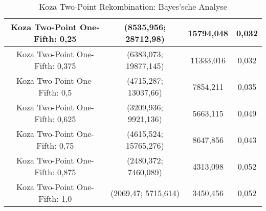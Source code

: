 \begin{table}[H]
\begin{tabular}{c | c | c | c}
		\hline
		Koza Two-Point One-Fifth: 0,25 & (\color{red}8535,956\color{black}; \color{red}28712,98\color{black}) & \color{red}15794,048\color{black} & \color{red}0,032\color{black}\\
		\hline
		Koza Two-Point One-Fifth: 0,375 & (6383,073; 19877,145) & 11333,016 & \color{red}0,032\color{black}\\
		\hline
		Koza Two-Point One-Fifth: 0,5 & (4715,287; 13037,66) & 7854,211 & 0,035\\
		\hline
		Koza Two-Point One-Fifth: 0,625 & (3209,936; 9921,136) & 5663,115 & 0,049\\
		\hline
		Koza Two-Point One-Fifth: 0,75 & (4615,524; 15765,276) & 8647,856 & 0,043\\
		\hline
		Koza Two-Point One-Fifth: 0,875 & (2480,372; \color{Green}7460,089\color{black}) & 4313,098 & \color{Green}0,052\color{black}\\
		\hline
		Koza Two-Point One-Fifth: 1,0 & (\color{Green}2069,47\color{black}; \color{Green}5715,614\color{black}) & \color{Green}3450,456\color{black} & 0,052\\
	\end{tabular}
	\caption{Koza Two-Point Rekombination: Bayes'sche Analyse}
	\label{table:kozaTwoPointBayesian}
\end{table} 
